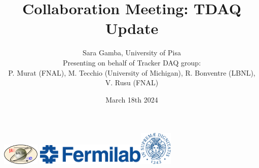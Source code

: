 \documentclass{beamer}[10pt]
\title[TDAQ \& VST]{
  {
    \bf {Collaboration Meeting: TDAQ Update} }
}
\author[Sara Gamba]{
  \fontseries{s}
  \selectfont
  { Sara Gamba, University of Pisa \\ \vspace{4mm} Presenting on behalf of Tracker DAQ group: \\ P. Murat (FNAL), M. Tecchio (University of Michigan), R. Bonventre (LBNL), V. Rusu (FNAL)}
}
\date{March 18th 2024}
\begin{document}
% 
% 



\begin{frame}
\centering
\includegraphics[height=1cm]{figures/png/mu2e_logo_oval.png}
\titlepage
\centering
\includegraphics[height=1cm]{figures/png/FNAL-Logo-NAL-Blue.png}\hspace{10mm}\includegraphics[height=1.6cm]{figures/pdf/cherubino.pdf}

\end{frame}
\end{document}
